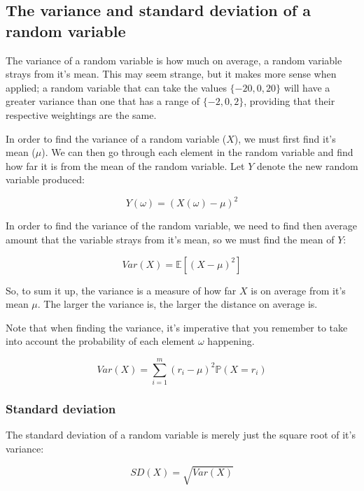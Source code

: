\subsection{The variance and standard deviation of a random variable}

The variance of a random variable is how much on average, a random variable
strays from it's mean. This may seem strange, but it makes more sense when
applied; a random variable that can take the values $\{-20, 0, 20\}$ will have
a greater variance than one that has a range of $\{-2, 0, 2\}$, providing that
their respective weightings are the same.

In order to find the variance of a random variable ($X$), we must first find
it's mean ($\mu$). We can then go through each element in the random variable
and find how far it is from the mean of the random variable. Let $Y$ denote
the new random variable produced:

\begin{dmath*}
	Y(\omega) = (X(\omega) - \mu)^2
\end{dmath*}

In order to find the variance of the random variable, we need to find then
average amount that the variable strays from it's mean, so we must find the
mean of $Y$:

\begin{dmath*}
	Var(X) = \mathbb{E}[(X - \mu)^2]
\end{dmath*}

So, to sum it up, the variance is a measure of how far $X$ is on average from
it's mean $\mu$. The larger the variance is, the larger the distance on
average is.

Note that when finding the variance, it's imperative that you remember to take
into account the probability of each element $\omega$ happening.

\begin{dmath*}
	{Var(X) = \sum\limits_{i=1}^{m}(r_i - \mu)^2\mathbb{P}(X=r_i)}
\end{dmath*}

\subsubsection{Standard deviation}

The standard deviation of a random variable is merely just the square root of
it's variance:

\begin{dmath*}
	SD(X) = \sqrt{Var(X)}
\end{dmath*}

